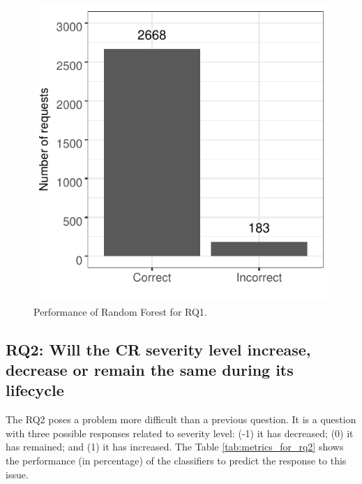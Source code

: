 \documentclass[10pt, conference]{IEEEtran}
\begin{document}
\begin{figure}[!hbt]
  \label{fig:rf_performance_for_q1}
  \includegraphics{figures/rf_performance_for_q1.pdf}
  \caption{Performance of Random Forest for RQ1.}
\end{figure}

\subsection{RQ2: Will the CR severity level increase, decrease or remain the same during its lifecycle}

The RQ2 poses a problem more difficult than a previous question. It is a question with three possible responses related to severity level: (-1) it has decreased; (0)  it has remained; and (1) it has increased. The Table \ref{tab:metrics_for_rq2} shows the performance (in percentage) of the classifiers to predict the response to this issue.
\end{document}
